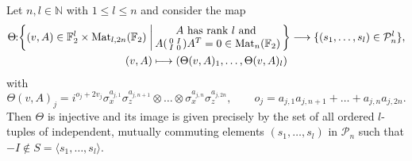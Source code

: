 \documentclass[a4paper, oneside, 12pt]{amsart}
\newcommand*{\PauliGroup}{\ensuremath{\mathcal{P}}}
\begin{document}
\begin{lemma}\label{lem:stabiliser-matrix-bijection}
  Let \(n, l \in \mathbb{N}\) with \(1 \leq l \leq n\) and consider the map
  \begin{equation}
    \begin{gathered}
      \Theta \from\!\!\!\left\{(v,A) \in \mathbb{F}_{2}^{l}\times \Mat_{l,2n}( \mathbb{F}_{2}) \;\middle|\!\!
      \begin{array}{c}
        A \text{ has rank }l \text{ and }\\
        A
        \begin{psmallmatrix}
          0 & I \\ I & 0
        \end{psmallmatrix}A^{T} = 0 \in \Mat_{n}( \mathbb{F}_{2})
      \end{array}\!\!
      \right\} \to\{ (s_{1}, \dots , s_{l}) \in \PauliGroup_{n}^{l}\},\\
      (v, A)  \mapsto (\Theta(v,A)_{1}, \dots , \Theta(v,A)_{l})
    \end{gathered}
  \end{equation}
  with
  \begin{equation*}
    \Theta(v,A)_{j} = i^{o_{j} + 2v_{j}} \sigma_{x}^{a_{j,1}}\sigma_{z}^{a_{j,n+1}} \otimes \dots \otimes \sigma_{x}^{a_{j,n}}\sigma_{z}^{a_{j,2n}}, \qquad o_{j} = a_{j,1}a_{j,n+1} + \dots + a_{j,n}a_{j,2n}.
  \end{equation*}
  Then \(\Theta\) is injective and its image is given precisely by the set of all ordered \(l\)-tuples of independent, mutually commuting elements \((s_1, \dots, s_l)\) in \(\PauliGroup_n\) such that \(-I \notin S = \langle s_1, \dots, s_l \rangle\).
\end{lemma}
\end{document}
